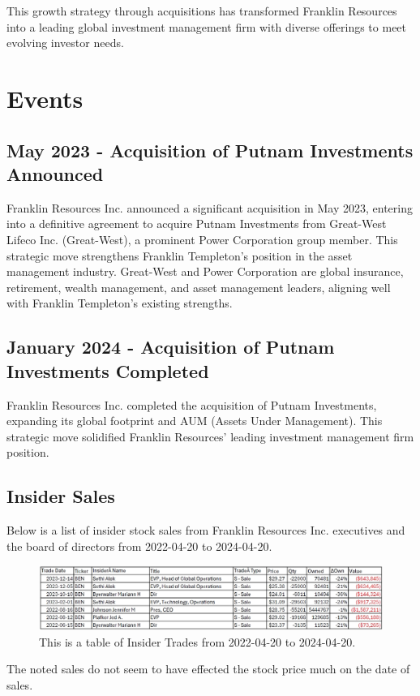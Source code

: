 \documentclass[9pt,a4paper,twoside]{tau}
\begin{document}
    This growth strategy through acquisitions has transformed Franklin Resources into a leading global investment management firm with diverse offerings to meet evolving investor needs.
    
\section{Events}

    \subsection{May 2023 - Acquisition of Putnam Investments Announced}
	
        Franklin Resources Inc. announced a significant acquisition in May 2023, entering into a definitive agreement to acquire Putnam Investments from Great-West Lifeco Inc. (Great-West), a prominent Power Corporation group member. This strategic move strengthens Franklin Templeton’s position in the asset management industry. Great-West and Power Corporation are global insurance, retirement, wealth management, and asset management leaders, aligning well with Franklin Templeton’s existing strengths.

    \subsection{January 2024 - Acquisition of Putnam Investments Completed}
	
        Franklin Resources Inc. completed the acquisition of Putnam Investments, expanding its global footprint and AUM (Assets Under Management). This strategic move solidified Franklin Resources’ leading investment management firm position.
    
    \subsection{Insider Sales}
        Below is a list of insider stock sales from Franklin Resources Inc. executives and the board of directors from 2022-04-20 to 2024-04-20. 
    
            \begin{figure}[H]
                \centering
                \includegraphics[width=0.95\columnwidth]{images/InsiderTrades.jpg}
                \caption{This is a table of Insider Trades from 2022-04-20 to 2024-04-20.}
                \label{fig:figure}
            \end{figure}
        The noted sales do not seem to have effected the stock price much on the date of sales. 
        
\end{document}
